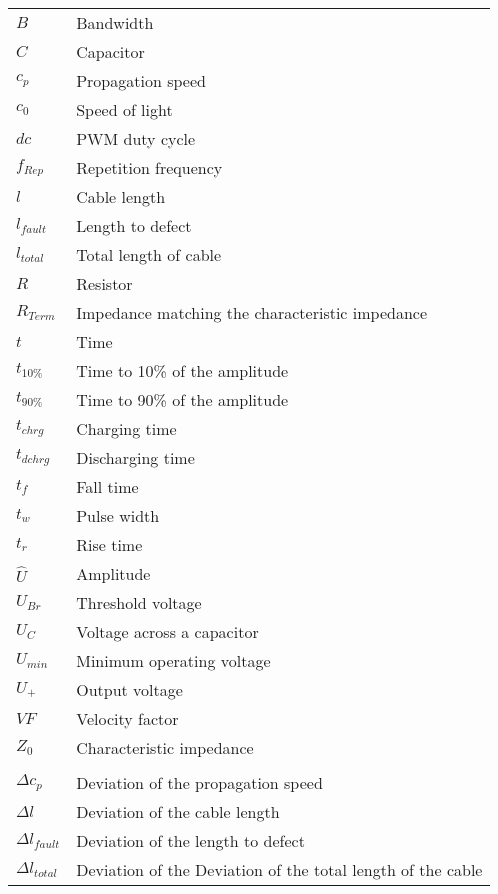 \begin{table}[h]
    \begin{tabular}{@{}ll@{}}%
        \( B \) & Bandwidth\\
        \( C \) & Capacitor\\
        \( c_p \) & Propagation speed\\
        \( c_0 \) & Speed of light\\
        \( dc \) & PWM duty cycle \\
		\( f_{Rep} \) & Repetition frequency\\
		\( l \) & Cable length\\
		\( l_{fault} \) & Length to defect\\
        \( l_{total} \) & Total length of cable\\
        \( R \) & Resistor\\
		\( R_{Term} \) & Impedance matching the characteristic impedance\\
        \( t \) & Time\\
        \( t_{10\%} \) & Time to 10\% of the amplitude\\
        \( t_{90\%} \) & Time to 90\% of the amplitude\\
		\( t_{chrg} \) & Charging time\\
		\( t_{dchrg} \) & Discharging time\\
		\( t_f \) & Fall time\\
		\( t_w \) & Pulse width\\
		\( t_{r} \) & Rise time\\
		\( \hat{U} \) & Amplitude\\
        \( U_{Br} \) & Threshold voltage\\
        \( U_C \) & Voltage across a capacitor \\
		\( U_{min} \) & Minimum operating voltage\\
		\( U_{+} \) & Output voltage\\
		\( VF \) & Velocity factor\\
        \( Z_0 \) & Characteristic impedance\\
        & \\
        \( \Delta c_p \) & Deviation of the propagation speed\\
        \( \Delta l \) & Deviation of the cable length\\
        \( \Delta l_{fault} \) & Deviation of the length to defect\\
        \( \Delta l_{total} \) & Deviation of the Deviation of the total length of the cable\\

\end{tabular}
\end{table}
